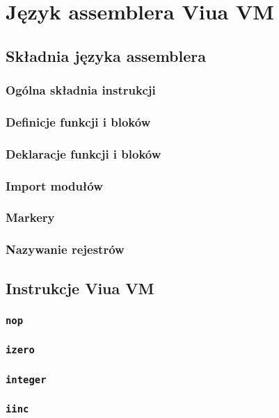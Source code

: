 \section{Język assemblera Viua VM}
\label{appendix_viua_vm_assembly_language}

\subsection{Składnia języka assemblera}

\subsubsection{Ogólna składnia instrukcji}
\subsubsection{Definicje funkcji i bloków}
\subsubsection{Deklaracje funkcji i bloków}
\subsubsection{Import modułów}
\subsubsection{Markery}
\subsubsection{Nazywanie rejestrów}

\subsection{Instrukcje Viua VM}

\subsubsection{\texttt{nop}}

\subsubsection{\texttt{izero}}
\subsubsection{\texttt{integer}}
\subsubsection{\texttt{iinc}}
